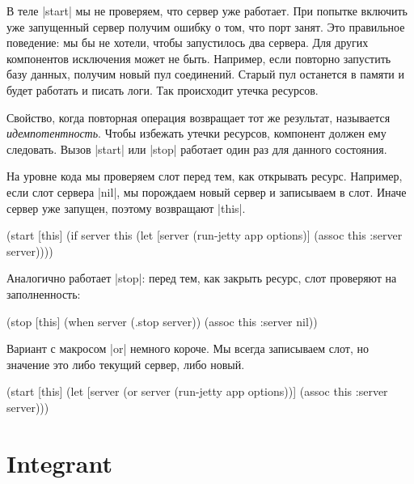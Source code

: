 В теле \spverb|start| мы не проверяем, что сервер уже работает. При попытке
включить уже запущенный сервер получим ошибку о том, что порт занят. Это
правильное поведение: мы бы не хотели, чтобы запустилось два сервера. Для других
компонентов исключения может не быть. Например, если повторно запустить базу
данных, получим новый пул соединений. Старый пул останется в памяти и будет
работать и писать логи. Так происходит утечка ресурсов.

Свойство, когда повторная операция возвращает тот же результат, называется
\emph{идемпотентность}. Чтобы избежать утечки ресурсов, компонент должен ему
следовать. Вызов \spverb|start| или \spverb|stop| работает один раз для данного
состояния.

На уровне кода мы проверяем слот перед тем, как открывать ресурс. Например, если
слот сервера \spverb|nil|, мы порождаем новый сервер и записываем в слот. Иначе
сервер уже запущен, поэтому возвращают \spverb|this|.

\begin{english}
  \begin{clojure}
(start [this]
  (if server
    this
    (let [server (run-jetty app options)]
      (assoc this :server server))))
  \end{clojure}
\end{english}

Аналогично работает \spverb|stop|: перед тем, как закрыть ресурс, слот проверяют
на заполненность:

\begin{english}
  \begin{clojure}
(stop [this]
  (when server
    (.stop server))
  (assoc this :server nil))
  \end{clojure}
\end{english}

Вариант с макросом \spverb|or| немного короче. Мы всегда записываем слот, но
значение это либо текущий сервер, либо новый.

\begin{english}
  \begin{clojure}
(start [this]
  (let [server (or server (run-jetty app options))]
    (assoc this :server server)))
  \end{clojure}
\end{english}

\section{Integrant}

